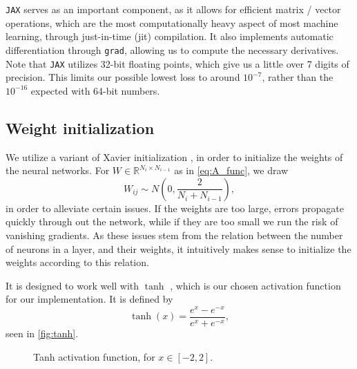 \verb|JAX| serves as an important component, as it allows for efficient matrix / vector operations, which are the most computationally heavy aspect of most machine learning, through just-in-time (jit) compilation.
It also implements automatic differentiation through \verb|grad|, allowing us to compute the necessary derivatives.
Note that \verb|JAX| utilizes 32-bit floating points, which give us a little over 7 digits of precision.
This limits our possible lowest loss to around $10^{-7}$, rather than the $10^{-16}$ expected with 64-bit numbers.

\subsection{Weight initialization}
We utilize a variant of Xavier initialization \cite{Glorot2010UnderstandingTD}, in order to initialize the weights of the neural networks.
For $W \in \mathbb{R}^{N_i \times N_{i-1}}$ as in \eqref{eq:A_func}, we draw
\begin{equation}
    W_{ij} \sim N\left(0, \frac{2}{N_i + N_{i-1}} \right),
\end{equation}
in order to alleviate certain issues.
If the weights are too large, errors propagate quickly through out the network, while if they are too small we run the risk of vanishing gradients.
As these issues stem from the relation between the number of neurons in a layer, and their weights, it intuitively makes sense to initialize the weights according to this relation.

It is designed to work well with $\tanh$ \cite{tanhXavier}, which is our chosen activation function for our implementation.
It is defined by
\begin{equation}
    \tanh(x) = \frac{e^x - e^{-x}}{e^x + e^{-x}},
\end{equation}
seen in \autoref{fig:tanh}.

\begin{figure}[h]
    
    \caption{Tanh activation function, for $x \in [-2, 2]$.}
    \label{fig:tanh}
\end{figure}